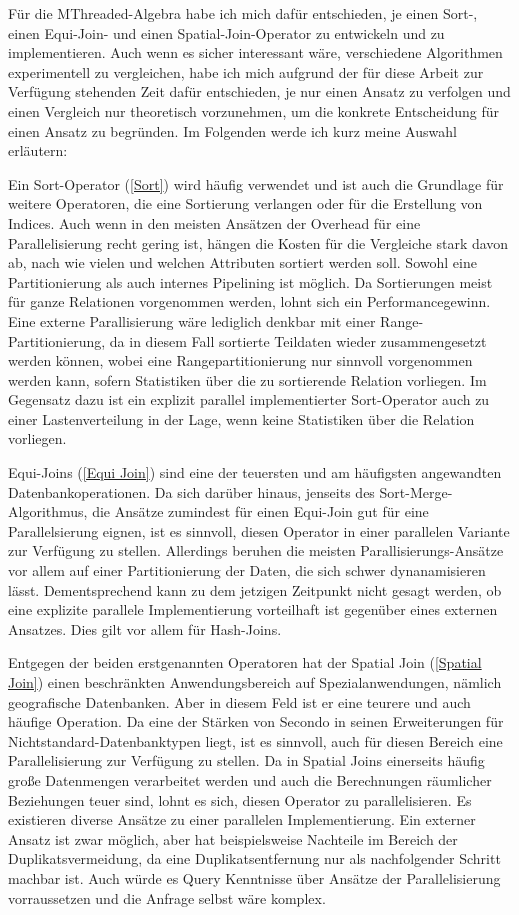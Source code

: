 \documentclass[a4paper,12pt,twoside]{article}
\begin{document}
Für die MThreaded-Algebra habe ich mich dafür entschieden, je einen Sort-, einen Equi-Join- und einen Spatial-Join-Operator zu entwickeln und zu implementieren. Auch wenn es sicher interessant wäre, verschiedene Algorithmen experimentell zu vergleichen, habe ich mich aufgrund der für diese Arbeit zur Verfügung stehenden Zeit dafür entschieden, je nur einen Ansatz zu verfolgen und einen Vergleich nur theoretisch vorzunehmen, um die konkrete Entscheidung für einen Ansatz zu begründen. Im Folgenden werde ich kurz meine Auswahl erläutern:

Ein Sort-Operator (\autoref{Sort}) wird häufig verwendet und ist auch die Grundlage für weitere Operatoren, die eine Sortierung verlangen oder für die Erstellung von Indices. Auch wenn in den meisten Ansätzen der Overhead für eine Parallelisierung recht gering ist, hängen die Kosten für die Vergleiche stark davon ab, nach wie vielen und welchen Attributen sortiert werden soll. Sowohl eine Partitionierung als auch internes Pipelining ist möglich. Da Sortierungen meist für ganze Relationen vorgenommen werden, lohnt sich ein Performancegewinn. Eine externe Parallisierung wäre lediglich denkbar mit einer Range-Partitionierung, da in diesem Fall sortierte Teildaten wieder zusammengesetzt werden können, wobei eine Rangepartitionierung nur sinnvoll vorgenommen werden kann, sofern Statistiken über die zu sortierende Relation vorliegen. Im Gegensatz dazu ist ein explizit parallel implementierter Sort-Operator auch zu einer Lastenverteilung in der Lage, wenn keine Statistiken über die Relation vorliegen.

Equi-Joins (\autoref{Equi Join}) sind eine der teuersten und am häufigsten angewandten Datenbankoperationen. Da sich darüber hinaus, jenseits des Sort-Merge-Algorithmus, die Ansätze zumindest für einen Equi-Join gut für eine Parallelsierung eignen, ist es sinnvoll, diesen Operator in einer parallelen Variante zur Verfügung zu stellen. Allerdings beruhen die meisten Parallisierungs-Ansätze vor allem auf einer Partitionierung der Daten, die sich schwer dynanamisieren lässt. Dementsprechend kann zu dem jetzigen Zeitpunkt nicht gesagt werden, ob eine explizite parallele Implementierung vorteilhaft ist gegenüber eines externen Ansatzes. Dies gilt vor allem für Hash-Joins.

Entgegen der beiden erstgenannten Operatoren hat der Spatial Join (\autoref{Spatial Join}) einen beschränkten Anwendungsbereich auf Spezialanwendungen, nämlich geografische Datenbanken. Aber in diesem Feld ist er eine teurere und auch häufige Operation. Da eine der Stärken von Secondo in seinen Erweiterungen für Nichtstandard-Datenbanktypen liegt, ist es sinnvoll, auch für diesen Bereich eine Parallelisierung zur Verfügung zu stellen. Da in Spatial Joins einerseits häufig große Datenmengen verarbeitet werden und auch die Berechnungen räumlicher Beziehungen teuer sind, lohnt es sich, diesen Operator zu parallelisieren. Es existieren diverse Ansätze zu einer parallelen Implementierung. Ein externer Ansatz ist zwar möglich, aber hat beispielsweise Nachteile im Bereich der Duplikatsvermeidung, da eine Duplikatsentfernung nur als nachfolgender Schritt machbar ist. Auch würde es Query Kenntnisse über Ansätze der Parallelisierung vorraussetzen und die Anfrage selbst wäre komplex. 
\end{document}

